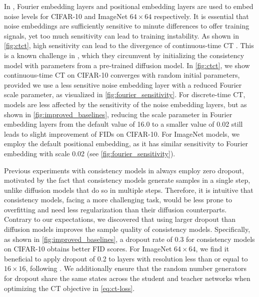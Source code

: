 In \citet{song2023consistency}, Fourier embedding layers \citep{tancik2020fourier} and positional embedding layers \citep{vaswani2017attention} are used to embed noise levels for CIFAR-10 and ImageNet $64\times 64$ respectively. %
It is essential that noise embeddings are sufficiently sensitive to minute differences to offer training signals, yet too much sensitivity can lead to training instability. As shown in \cref{fig:ctct}, high sensitivity can lead to the divergence of continuous-time CT \citep{song2023consistency}. This is a known challenge in \citet{song2023consistency}, which they circumvent by initializing the consistency model with parameters from a pre-trained diffusion model. In \cref{fig:ctct}, we show continuous-time CT on CIFAR-10 converges with random initial parameters, provided we use a less sensitive noise embedding layer with a reduced Fourier scale parameter, as visualized in \cref{fig:fourier_sensitivity}. %
For discrete-time CT, models are less affected by the sensitivity of the noise embedding layers, but as shown in \cref{fig:improved_baselines}, reducing the scale parameter in Fourier embedding layers from the default value of 16.0 to a smaller value of 0.02 still leads to slight improvement of FIDs on CIFAR-10. For ImageNet models, we employ the default positional embedding, as it has similar sensitivity to Fourier embedding with scale 0.02 (see \cref{fig:fourier_sensitivity}). %

Previous experiments with consistency models in \citet{song2023consistency} always employ zero dropout, motivated by the fact that consistency models generate samples in a single step, unlike diffusion models that do so in multiple steps. Therefore, it is intuitive that consistency models, facing a more challenging task, would be less prone to overfitting and need less regularization than their diffusion counterparts. Contrary to our expectations, we discovered that using larger dropout than diffusion models improves the sample quality of consistency models. Specifically, as shown in \cref{fig:improved_baselines}, a dropout rate of 0.3 for consistency models on CIFAR-10 obtains better FID scores. For ImageNet $64\times 64$, we find it beneficial to apply dropout of 0.2 to layers with resolution less than or equal to $16\times 16$, following \citet{hoogeboom2023simple}. We additionally ensure that the random number generators for dropout share the same states across the student and teacher networks when optimizing the CT objective in \cref{eq:ct-loss}.

